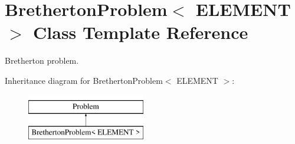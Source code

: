 \hypertarget{classBrethertonProblem}{}\section{Bretherton\+Problem$<$ E\+L\+E\+M\+E\+NT $>$ Class Template Reference}
\label{classBrethertonProblem}


Bretherton problem.  


Inheritance diagram for Bretherton\+Problem$<$ E\+L\+E\+M\+E\+NT $>$\+:\begin{figure}[H]
\begin{center}
\leavevmode
\includegraphics[height=2.000000cm]{classBrethertonProblem}
\end{center}
\end{figure}
